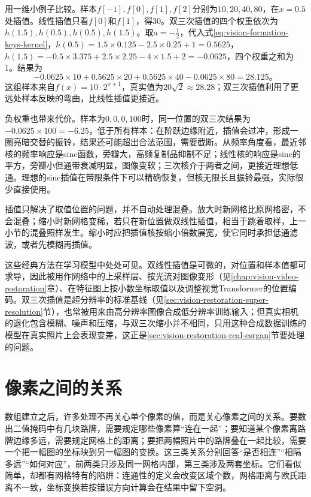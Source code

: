 用一维小例子比较。样本$f[-1],f[0],f[1],f[2]$分别为$10,20,40,80$，在$x=0.5$处插值。线性插值只看$f[0]$和$f[1]$，得$30$。双三次插值的四个权重依次为$h(1.5),h(0.5),h(0.5),h(1.5)$。取$a=-\tfrac12$，代入式\eqref{eq:vision-formation-keys-kernel}，$h(0.5)=1.5\times0.125-2.5\times0.25+1=0.5625$，$h(1.5)=-0.5\times3.375+2.5\times2.25-4\times1.5+2=-0.0625$，四个权重之和为1。结果为
\[
  -0.0625\times10+0.5625\times20+0.5625\times40-0.0625\times80=28.125\text{。}
\]
这组样本来自$f(x)=10\cdot2^{x+1}$，真实值为$20\sqrt2\approx28.28$；双三次插值利用了更远处样本反映的弯曲，比线性插值更接近。

负权重也带来代价。样本为$0,0,0,100$时，同一位置的双三次结果为$-0.0625\times100=-6.25$，低于所有样本：在阶跃边缘附近，插值会过冲，形成一圈亮暗交替的振铃，结果还可能超出合法范围，需要截断。从频率角度看，最近邻核的频率响应是sinc函数，旁瓣大，高频复制品抑制不足；线性核的响应是sinc的平方，旁瓣小但通带衰减明显，图像变软；三次核介于两者之间，更接近理想低通。理想的sinc插值在带限条件下可以精确恢复，但核无限长且振铃最强，实际很少直接使用。

插值只解决了取值位置的问题，并不自动处理混叠。放大时新网格比原网格密，不会混叠；缩小时新网格变稀，若只在新位置做双线性插值，相当于跳着取样，上一小节的混叠照样发生。缩小时应把插值核按缩小倍数展宽，使它同时承担低通滤波，或者先模糊再插值。

这些经典方法在学习模型中处处可见。双线性插值是可微的，对位置和样本值都可求导，因此被用作网络中的上采样层、按光流对图像变形（见\ref{chap:vision-video-restoration}章）、在特征图上按小数坐标取值以及调整视觉Transformer的位置编码。双三次插值是超分辨率的标准基线（见\ref{sec:vision-restoration-super-resolution}节），也常被用来由高分辨率图像合成低分辨率训练输入；但真实相机的退化包含模糊、噪声和压缩，与双三次缩小并不相同，只用这种合成数据训练的模型在真实照片上会表现变差，这正是\ref{sec:vision-restoration-real-esrgan}节要处理的问题。

\section{像素之间的关系}
\label{sec:vision-formation-pixel-relations}

数组建立之后，许多处理不再关心单个像素的值，而是关心像素之间的关系。要数出二值掩码中有几块路牌，需要规定哪些像素算“连在一起”；要知道某个像素离路牌边缘多远，需要规定网格上的距离；要把两幅照片中的路牌叠在一起比较，需要一个把一幅图的坐标映到另一幅图的变换。这三类关系分别回答“是否相连”“相隔多远”“如何对应”，前两类只涉及同一网格内部，第三类涉及两套坐标。它们看似简单，却都有网格特有的陷阱：连通性的定义会改变区域个数，网格距离与欧氏距离不一致，坐标变换若按错误方向计算会在结果中留下空洞。

